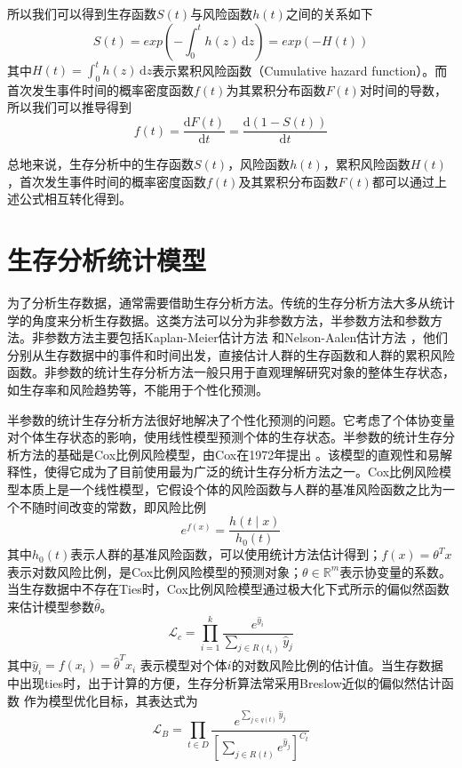 所以我们可以得到生存函数$S(t)$与风险函数$h(t)$之间的关系如下
\begin{equation}
S(t)=exp⁡\left(-\int_0^{t} h(z)\,\mathrm{d}z\right)=exp⁡(-H(t)) \label{F2}
\end{equation}
其中$H(t)=\int_0^{t} h(z)\,\mathrm{d}z$表示累积风险函数（Cumulative hazard function）。而首次发生事件时间的概率密度函数$f(t)$为其累积分布函数$F(t)$对时间的导数，所以我们可以推导得到
\begin{equation}
f(t)=\frac{\mathrm{d}F(t)}{\mathrm{d}t}=\frac{\mathrm{d}(1-S(t))}{\mathrm{d}t} \label{F3}
\end{equation}

总地来说，生存分析中的生存函数$S(t)$，风险函数$h(t)$，累积风险函数$H(t)$，首次发生事件时间的概率密度函数$f(t)$及其累积分布函数$F(t)$都可以通过上述公式相互转化得到。

\section{生存分析统计模型}

为了分析生存数据，通常需要借助生存分析方法。传统的生存分析方法大多从统计学的角度来分析生存数据。这类方法可以分为非参数方法，半参数方法和参数方法。非参数方法主要包括Kaplan-Meier估计方法  和Nelson-Aalen估计方法 ，他们分别从生存数据中的事件和时间出发，直接估计人群的生存函数和人群的累积风险函数。非参数的统计生存分析方法一般只用于直观理解研究对象的整体生存状态，如生存率和风险趋势等，不能用于个性化预测。

半参数的统计生存分析方法很好地解决了个性化预测的问题。它考虑了个体协变量对个体生存状态的影响，使用线性模型预测个体的生存状态。半参数的统计生存分析方法的基础是Cox比例风险模型，由Cox在1972年提出 。该模型的直观性和易解释性，使得它成为了目前使用最为广泛的统计生存分析方法之一。Cox比例风险模型本质上是一个线性模型，它假设个体的风险函数与人群的基准风险函数之比为一个不随时间改变的常数，即风险比例
\begin{equation}
e^{f(x)} =\frac{h(t\mid x)}{h_0 (t)} \label{F4}
\end{equation}
其中$h_0 (t)$表示人群的基准风险函数，可以使用统计方法估计得到；$f(x)=\theta^T x$表示对数风险比例，是Cox比例风险模型的预测对象；$\theta \in \mathbb{R}^m$表示协变量的系数。当生存数据中不存在Ties时，Cox比例风险模型通过极大化下式所示的偏似然函数 来估计模型参数$\hat{\theta}$。
\begin{equation}
\mathcal{L}_c = \prod_{i=1}^k \frac{e^{\hat{y}_i}}{\sum_{j\in R(t_i)} \hat{y}_j} \label{F5}
\end{equation}
其中$\hat{y}_i=f(x_i)=\hat{\theta}^T x_i$ 表示模型对个体$i$的对数风险比例的估计值。当生存数据中出现ties时，出于计算的方便，生存分析算法常采用Breslow近似的偏似然估计函数 作为模型优化目标，其表达式为
\begin{equation}
\mathcal{L}_B = \prod_{t\in D} \frac{e^{\sum_{j\in q(t)} \hat{y}_j}}{[\sum_{j\in R(t)} e^{\hat{y}_j}]^{C_t}} \label{F6}
\end{equation}

